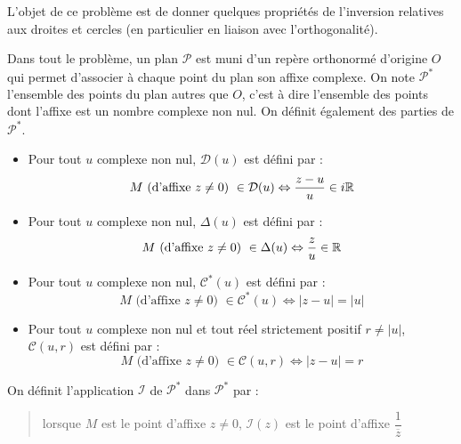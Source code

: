 L'objet de ce problème est de donner quelques propriétés de l'inversion relatives aux droites et cercles (en particulier en liaison avec l'orthogonalité).


Dans tout le problème, un plan $\mathcal P$ est muni d'un repère orthonormé d'origine $O$ qui permet d'associer à chaque point du plan son affixe complexe. On note $\mathcal P ^*$ l'ensemble des points du plan autres que $O$, c'est à dire l'ensemble des points dont l'affixe est un nombre complexe non nul.\newline
On définit également des parties  de $\mathcal P ^*$.

\begin{itemize}
 \item Pour tout $u$ complexe non nul, $\mathcal D(u)$ est défini par :
\begin{displaymath}
 M \text{ (d'affixe $z\neq0$) }\in \mathcal D(u) \Leftrightarrow \dfrac{z-u}{u}\in i\mathbb{R}
\end{displaymath}

 \item Pour tout $u$ complexe non nul, $\Delta(u)$ est défini par :
\begin{displaymath}
 M \text{ (d'affixe $z\neq0$) }\in \Delta(u) \Leftrightarrow \dfrac{z}{u}\in \mathbb{R}
\end{displaymath}

 \item Pour tout $u$ complexe non nul, $\mathcal C^*(u)$ est défini par :
\begin{displaymath}
 M \text{ (d'affixe $z\neq0$) }\in \mathcal C^*(u) \Leftrightarrow |z-u|=|u|
\end{displaymath}

 \item Pour tout $u$ complexe non nul et tout réel strictement positif $r\neq|u|$, $\mathcal C(u,r)$ est défini par :
\begin{displaymath}
 M \text{ (d'affixe $z\neq0$) }\in \mathcal C(u,r) \Leftrightarrow |z-u|=r
\end{displaymath}
\end{itemize}

On définit l'application $\mathcal I$ de $\mathcal P^*$ dans  $\mathcal P^*$ par :
\begin{quotation}
 lorsque $M$ est le point d'affixe $z\neq0$, $\mathcal I (z)$ est le point d'affixe $\dfrac{1}{\overline{z}}$
\end{quotation}

